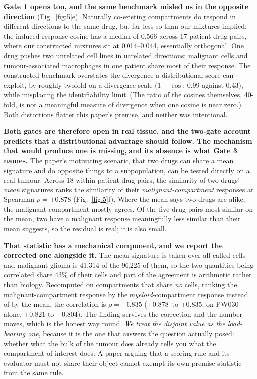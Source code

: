 \documentclass[11pt,letterpaper]{article}
\newcommand{\PREMISEOVERLAP}{+0.878}
\newcommand{\PREMISEDISJOINT}{+0.835}
\begin{document}
\textbf{Gate 1 opens too, and the same benchmark misled us in the opposite direction}
(Fig.~\ref{fig:5}e). Naturally co-existing compartments do respond in different directions to the
same drug, but far less so than our mixtures implied: the induced response cosine has a median of
0.566 across 17 patient-drug pairs, where our constructed mixtures sit at
0.014--0.044, essentially orthogonal. One drug pushes two unrelated cell lines in unrelated
directions; malignant cells and tumour-associated macrophages in one patient share most of their
response. The constructed benchmark overstates the divergence a distributional score can
exploit, by roughly twofold on a divergence scale ($1-\cos$: 0.99 against 0.43), while misplacing
the identifiability limit. (The ratio of the cosines themselves, 40-fold, is not a meaningful
measure of divergence when one cosine is near zero.) Both distortions
flatter this paper's premise, and neither was intentional.

\textbf{Both gates are therefore open in real tissue, and the two-gate account predicts that a
distributional advantage should follow. The mechanism that would produce one is missing, and its
absence is what Gate 3 names.} The
paper's motivating scenario, that two drugs can share a mean signature and do opposite things to a
subpopulation, can be tested directly on a real tumour. Across 18 within-patient drug pairs, the
similarity of two drugs' \emph{mean} signatures ranks the similarity of their
\emph{malignant-compartment} responses at Spearman $\rho = \mathbf{\PREMISEOVERLAP}$
(Fig.~\ref{fig:5}f).
Where the mean says two drugs are alike, the malignant compartment mostly agrees. Of the five drug
pairs most similar on the mean, two have a malignant response meaningfully less similar than their
mean suggests, so the residual is real; it is also small.

\textbf{That statistic has a mechanical component, and we report the corrected one alongside it.}
The mean signature is taken over all called cells and malignant glioma is 41,314 of the 96,225 of
them, so the two quantities being correlated share 43\% of their cells and part of the agreement
is arithmetic rather than biology. Recomputed on compartments that share \emph{no} cells, ranking
the malignant-compartment response by the \emph{myeloid}-compartment response instead of by the
mean, the correlation is $\rho = \mathbf{\PREMISEDISJOINT}$ (\PREMISEOVERLAP\ to
\PREMISEDISJOINT{}; on PW030 alone, $+0.821$ to $+0.804$). The finding survives the correction and
the number moves, which is the honest way round. \emph{We treat the disjoint value as the
load-bearing one}, because it is the one that answers the question actually posed: whether what
the bulk of the tumour does already tells you what the compartment of interest does. A paper
arguing that a scoring rule and its evaluator must not share their object cannot exempt its own
premise statistic from the same rule.
\end{document}
